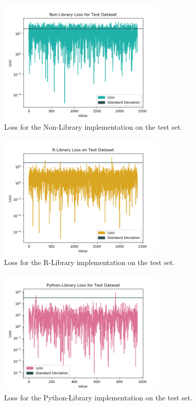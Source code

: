 \documentclass[letterpaper]{article} %
\begin{document}



\begin{figure}[htbp]
\centerline{\includegraphics[width=8cm]{non_lib_loss.png}}
\caption{Loss for the Non-Library implementation on the test set.}
\label{fig:non-lib}
\end{figure}

\begin{figure}[htbp]
\centerline{\includegraphics[width=8cm]{r_lib_loss.png}}
\caption{Loss for the R-Library implementation on the test set.}
\label{fig:r-lib}
\end{figure}

\begin{figure}[htbp]
\centerline{\includegraphics[width=8cm]{python_lib_loss.png}}
\caption{Loss for the Python-Library implementation on the test set.}
\label{fig:python-lib}
\end{figure}
\end{document}
